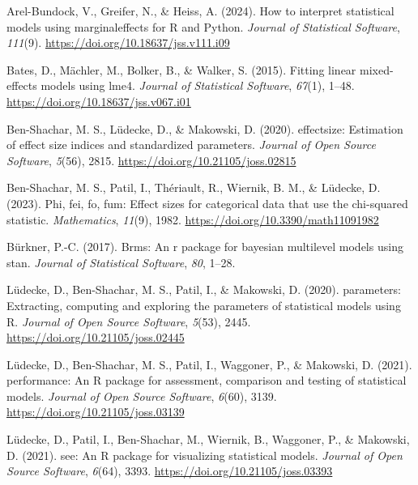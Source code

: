 \documentclass{article}
\newlength{\cslhangindent}
\newenvironment{CSLReferences}[2] %
 {\begin{list}{}{%
  \setlength{\itemindent}{0pt}
  \setlength{\leftmargin}{0pt}
  \setlength{\parsep}{0pt}
  \ifodd #1
   \setlength{\leftmargin}{\cslhangindent}
   \setlength{\itemindent}{-1\cslhangindent}
  \fi
  \setlength{\itemsep}{#2\baselineskip}}}
 {\end{list}}
\begin{document}
\protect{}\label{refs}
\begin{CSLReferences}{1}{0}
Arel-Bundock, V., Greifer, N., \& Heiss, A. (2024). How to interpret
statistical models using marginaleffects for {R} and {Python}.
\emph{Journal of Statistical Software}, \emph{111}(9).
\url{https://doi.org/10.18637/jss.v111.i09}

Bates, D., Mächler, M., Bolker, B., \& Walker, S. (2015). Fitting linear
mixed-effects models using lme4. \emph{Journal of Statistical Software},
\emph{67}(1), 1--48. \url{https://doi.org/10.18637/jss.v067.i01}

Ben-Shachar, M. S., Lüdecke, D., \& Makowski, D. (2020). {effectsize}:
Estimation of effect size indices and standardized parameters.
\emph{Journal of Open Source Software}, \emph{5}(56), 2815.
\url{https://doi.org/10.21105/joss.02815}

Ben-Shachar, M. S., Patil, I., Thériault, R., Wiernik, B. M., \&
Lüdecke, D. (2023). Phi, fei, fo, fum: Effect sizes for categorical data
that use the chi-squared statistic. \emph{Mathematics}, \emph{11}(9),
1982. \url{https://doi.org/10.3390/math11091982}

Bürkner, P.-C. (2017). Brms: An r package for bayesian multilevel models
using stan. \emph{Journal of Statistical Software}, \emph{80}, 1--28.

Lüdecke, D., Ben-Shachar, M. S., Patil, I., \& Makowski, D. (2020).
{parameters}: Extracting, computing and exploring the parameters of
statistical models using {R}. \emph{Journal of Open Source Software},
\emph{5}(53), 2445. \url{https://doi.org/10.21105/joss.02445}

Lüdecke, D., Ben-Shachar, M. S., Patil, I., Waggoner, P., \& Makowski,
D. (2021). {performance}: An {R} package for assessment, comparison and
testing of statistical models. \emph{Journal of Open Source Software},
\emph{6}(60), 3139. \url{https://doi.org/10.21105/joss.03139}

Lüdecke, D., Patil, I., Ben-Shachar, M., Wiernik, B., Waggoner, P., \&
Makowski, D. (2021). {see}: An {R} package for visualizing statistical
models. \emph{Journal of Open Source Software}, \emph{6}(64), 3393.
\url{https://doi.org/10.21105/joss.03393}


\end{CSLReferences}
\end{document}
